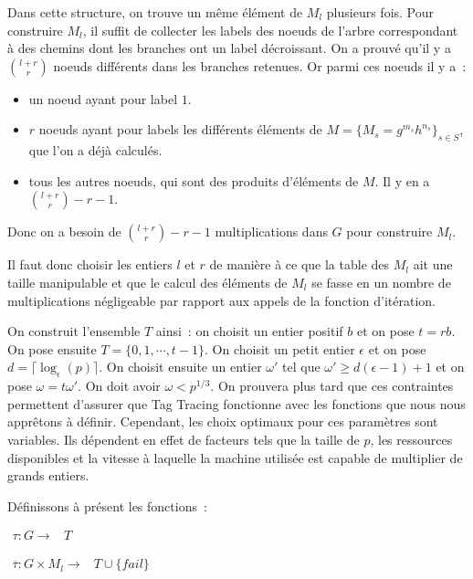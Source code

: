 		Dans cette structure, on trouve un même élément de $M_l$ plusieurs fois. Pour construire $M_l$, il suffit de collecter les labels des noeuds de l'arbre correspondant à des chemins dont les branches ont un label décroissant. On a prouvé qu'il y a $\binom{l+r}{r}$ noeuds différents dans les branches retenues. Or parmi ces noeuds il y a~:
		
		\begin{itemize}
		\item un noeud ayant pour label $1$.
		\item $r$ noeuds ayant pour labels les différents éléments de $M = \{M_s = g^{m_s} h^{n_s}\}_{s \in S}$, que l'on a déjà calculés.
		\item tous les autres noeuds, qui sont des produits d'éléments de $M$. Il y en a $\binom{l+r}{r} - r - 1$.
		\end{itemize}
		
		Donc on a besoin de $\binom{l+r}{r} - r - 1$ multiplications dans $G$ pour construire $M_l$.
		
		Il faut donc choisir les entiers $l$ et $r$ de manière à ce que la table des $M_l$ ait une taille manipulable et que le calcul des éléments de $M_l$ se fasse en un nombre de multiplications négligeable par rapport aux appels de la fonction d'itération.
		
		On construit l'ensemble $T$ ainsi~: on choisit un entier positif $b$ et on pose $t = rb$. On pose ensuite $T = \{0,1,\cdots,t-1\}$. On choisit un petit entier $\epsilon$ et on pose $d = \lceil\log_\epsilon(p)\rceil$. On choisit ensuite un entier $\omega'$ tel que $\omega' \ge d(\epsilon - 1) + 1$ et on pose $\omega = t\omega'$. On doit avoir $\omega < p^{1/3}$. On prouvera plus tard que ces contraintes permettent d'assurer que Tag Tracing fonctionne avec les fonctions que nous nous apprêtons à définir. Cependant, les choix optimaux pour ces paramètres sont variables. Ils dépendent en effet de facteurs tels que la taille de $p$, les ressources disponibles et la vitesse à laquelle la machine utilisée est capable de multiplier de grands entiers.
		
		Définissons à présent les fonctions~:
		
		$\begin{array}{lrcl}
		\tau : G \longrightarrow & T
		\end{array}$
		
		$\begin{array}{lrcl}
		\overline{\tau} : G \times M_l \longrightarrow & T \cup \{fail\}
		\end{array}$
		
